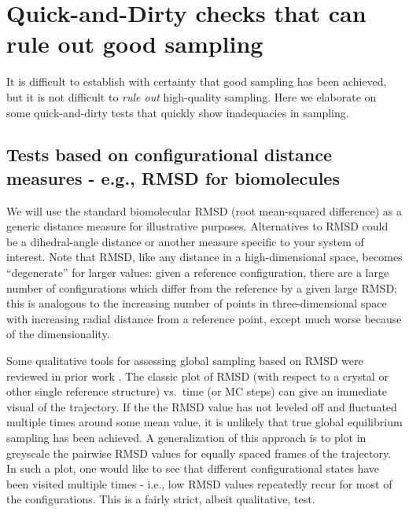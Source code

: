 \section{Quick-and-Dirty checks that can rule out good sampling}

It is difficult to establish with certainty that good sampling has been achieved, but it is not difficult to \emph{rule out} high-quality sampling.
Here we elaborate on some quick-and-dirty tests that quickly show inadequacies in sampling.

\subsection{Tests based on configurational distance measures - e.g., RMSD for biomolecules}

We will use the standard biomolecular RMSD (root mean-squared difference) as a generic distance measure for illustrative purposes.
Alternatives to RMSD could be a dihedral-angle distance or another measure specific to your system of interest.
Note that RMSD, like any distance in a high-dimensional space, becomes ``degenerate'' for larger values: given a reference configuration, there are a large number of configurations which differ from the reference by a given large RMSD; this is analogous to the increasing number of points in three-dimensional space with increasing radial distance from a reference point, except much worse because of the dimensionality. 

Some qualitative tools for assessing global sampling based on RMSD were reviewed in prior work \cite{Grossfield2009}.  
The classic plot of RMSD (with respect to a crystal or other single reference structure) vs.\ time (or MC steps) can give an immediate visual of the trajectory.  
If the the RMSD value has not leveled off and fluctuated multiple times around some mean value, it is unlikely that true global equilibrium sampling has been achieved.  
A generalization of this approach is to plot in greyscale the pairwise RMSD values for equally spaced frames of the trajectory.  
In such a plot, one would like to see that different configurational states have been visited multiple times - i.e., low RMSD values repeatedly recur for most of the configurations.  
This is a fairly strict, albeit qualitative, test.
